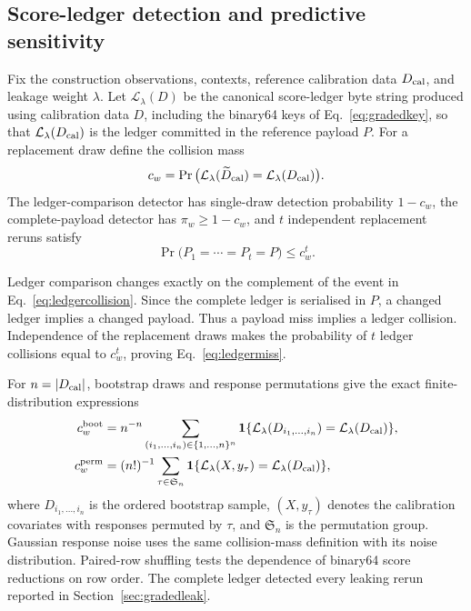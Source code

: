\subsection{Score-ledger detection and predictive sensitivity}

\begin{theorem}\label{thm:ledger}
Fix the construction observations, contexts, reference calibration data \(D_{\rm cal}\), and leakage weight \(\lambda\). Let \(\mathcal L_\lambda(D)\) be the canonical score-ledger byte string produced using calibration data \(D\), including the binary64 keys of Eq.~\eqref{eq:gradedkey}, so that \(\mathcal L_\lambda(D_{\rm cal})\) is the ledger committed in the reference payload \(P\). For a replacement draw define the collision mass
\begin{equation}\label{eq:ledgercollision}
c_w=\Pr\big(\mathcal L_\lambda(\widetilde D_{\rm cal})=\mathcal L_\lambda(D_{\rm cal})\big).
\end{equation}
The ledger-comparison detector has single-draw detection probability \(1-c_w\), the complete-payload detector has \(\pi_w\ge1-c_w\), and \(t\) independent replacement reruns satisfy
\begin{equation}\label{eq:ledgermiss}
\Pr\big(P_1=\cdots=P_t=P\big)\le c_w^t.
\end{equation}
\end{theorem}

\begin{pf}
Ledger comparison changes exactly on the complement of the event in Eq.~\eqref{eq:ledgercollision}. Since the complete ledger is serialised in \(P\), a changed ledger implies a changed payload. Thus a payload miss implies a ledger collision. Independence of the replacement draws makes the probability of \(t\) ledger collisions equal to \(c_w^t\), proving Eq.~\eqref{eq:ledgermiss}.
\end{pf}

For \(n=|D_{\rm cal}|\), bootstrap draws and response permutations give the exact finite-distribution expressions
\begin{align}
c_w^{\rm boot}
&=n^{-n}\sum_{(i_1,\ldots,i_n)\in\{1,\ldots,n\}^n}
\mathbf1\{\mathcal L_\lambda(D_{i_1,\ldots,i_n})=\mathcal L_\lambda(D_{\rm cal})\},\label{eq:bootcollision}\\
c_w^{\rm perm}
&=(n!)^{-1}\sum_{\tau\in\mathfrak S_n}
\mathbf1\{\mathcal L_\lambda(X,y_\tau)=\mathcal L_\lambda(D_{\rm cal})\},\label{eq:permcollision}
\end{align}
where \(D_{i_1,\ldots,i_n}\) is the ordered bootstrap sample, \((X,y_\tau)\) denotes the calibration covariates with responses permuted by \(\tau\), and \(\mathfrak S_n\) is the permutation group. Gaussian response noise uses the same collision-mass definition with its noise distribution. Paired-row shuffling tests the dependence of binary64 score reductions on row order. The complete ledger detected every leaking rerun reported in Section~\ref{sec:gradedleak}.

